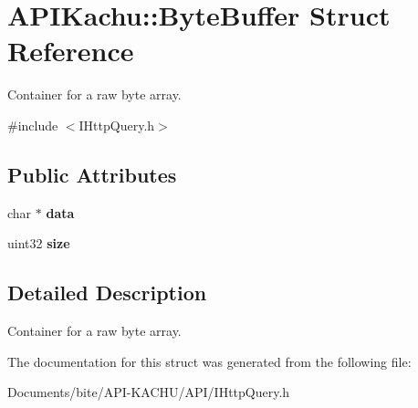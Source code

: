 \hypertarget{struct_a_p_i_kachu_1_1_byte_buffer}{}\section{A\+P\+I\+Kachu\+:\+:Byte\+Buffer Struct Reference}
\label{struct_a_p_i_kachu_1_1_byte_buffer}


Container for a raw byte array.  




{\ttfamily \#include $<$I\+Http\+Query.\+h$>$}

\subsection*{Public Attributes}
\begin{DoxyCompactItemize}
\item 
char $\ast$ {\bfseries data}\hypertarget{struct_a_p_i_kachu_1_1_byte_buffer_ac67760fc8b78b00801de4fb81e4d0899}{}\label{struct_a_p_i_kachu_1_1_byte_buffer_ac67760fc8b78b00801de4fb81e4d0899}

\item 
uint32 {\bfseries size}\hypertarget{struct_a_p_i_kachu_1_1_byte_buffer_ad401631eecddebd840bbfb01e9b08fa0}{}\label{struct_a_p_i_kachu_1_1_byte_buffer_ad401631eecddebd840bbfb01e9b08fa0}

\end{DoxyCompactItemize}


\subsection{Detailed Description}
Container for a raw byte array. 

The documentation for this struct was generated from the following file\+:\begin{DoxyCompactItemize}
\item 
Documents/bite/\+A\+P\+I-\/\+K\+A\+C\+H\+U/\+A\+P\+I/I\+Http\+Query.\+h\end{DoxyCompactItemize}
